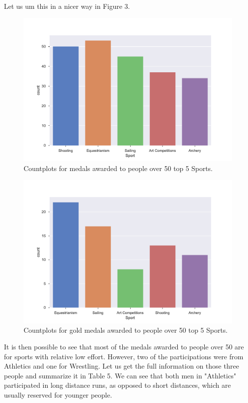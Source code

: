 \documentclass[11pt]{article} %
\begin{document}
Let us um this in a nicer way in Figure 3.

\begin{figure}
    \centering
    \includegraphics[scale=0.6]{Medal_Count_50.pdf}
    \caption{Countplots for medals awarded to people over 50 top 5 Sports.}
\end{figure}

\begin{figure}
    \centering
    \includegraphics[scale=0.6]{Gold_medal_Count_50.pdf}
    \caption{Countplots for gold medals awarded to people over 50 top 5 Sports.}
\end{figure}

It is then possible to see that most of the medals awarded to people over 50 are for sports with relative low effort. However, two of the participations were from Athletics and one for Wrestling. Let us get the full information on those three people and summarize it in Table 5. We can see that both men in "Athletics" participated in long distance runs, as opposed to short distances, which are usually reserved for younger people.
\end{document}
